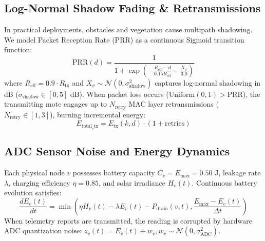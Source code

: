 \documentclass[journal]{IEEEtran}
\begin{document}
\subsection{Log-Normal Shadow Fading \& Retransmissions}
In practical deployments, obstacles and vegetation cause multipath shadowing. We model Packet Reception Rate (PRR) as a continuous Sigmoid transition function:
\begin{equation}
\text{PRR}(d) = \frac{1}{1 + \exp\left( -\frac{R_{\text{eff}} - d}{0.15 R_{\text{eff}}} - \frac{X_\sigma}{3.0} \right)}
\end{equation}
where $R_{\text{eff}} = 0.9 \cdot R_{\text{tx}}$ and $X_\sigma \sim \mathcal{N}(0, \sigma_{\text{shadow}}^2)$ captures log-normal shadowing in dB ($\sigma_{\text{shadow}} \in [0, 5]\text{ dB}$). When packet loss occurs ($\text{Uniform}(0, 1) > \text{PRR}$), the transmitting mote engages up to $N_{\text{retry}}$ MAC layer retransmissions ($N_{\text{retry}} \in [1, 3]$), burning incremental energy:
\begin{equation}
E_{\text{total\_tx}} = E_{\text{tx}}(k, d) \cdot (1 + \text{retries})
\end{equation}

\subsection{ADC Sensor Noise and Energy Dynamics}
Each physical node $v$ possesses battery capacity $C_v = E_{\text{max}} = 0.50\text{ J}$, leakage rate $\lambda$, charging efficiency $\eta = 0.85$, and solar irradiance $H_v(t)$. Continuous battery evolution satisfies:
\begin{equation}
\frac{dE_v(t)}{dt} = \min\left( \eta H_v(t) - \lambda E_v(t) - P_{\text{drain}}(v, t), \frac{E_{\text{max}} - E_v(t)}{\Delta t} \right)
\end{equation}
When telemetry reports are transmitted, the reading is corrupted by hardware ADC quantization noise: $z_v(t) = E_v(t) + w_v, w_v \sim \mathcal{N}(0, \sigma_{\text{ADC}}^2)$.
\end{document}
